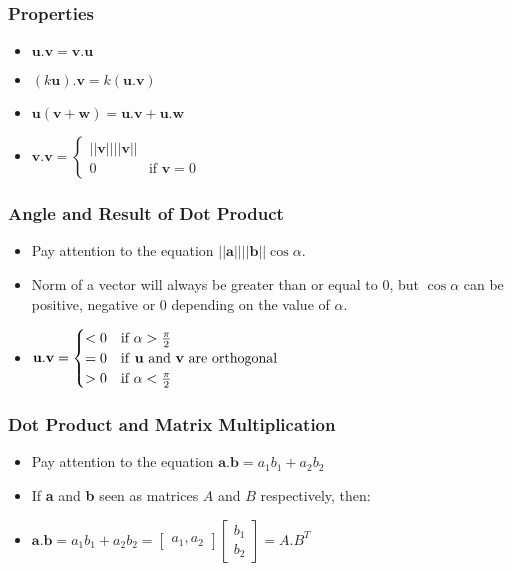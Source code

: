 \documentclass[a4paper,12pt]{article}
\begin{document}
\subsubsection*{Properties}
\begin{itemize}
  \item \(\textbf{u}.\textbf{v}=\textbf{v}.\textbf{u}\)
  \item \((k\textbf{u}).\textbf{v}=k(\textbf{u}.\textbf{v})\)
  \item \(\textbf{u}(\textbf{v}+\textbf{w})=\textbf{u}.\textbf{v}+\textbf{u}.\textbf{w}\)
  \item \(\textbf{v}.\textbf{v}=\begin{cases}
          ||\textbf{v}||||\textbf{v}|| \\
          0 & \text{if $\textbf{v}=0$}
        \end{cases}\)
\end{itemize}

\subsubsection*{Angle and Result of Dot Product}
\begin{itemize}
  \item Pay attention to the equation \(||\textbf{a}||||\textbf{b}||\cos\alpha\).
  \item Norm of a vector will always be greater than or equal to 0, but \(\cos\alpha\) can be positive, negative or 0 depending on the value of \(\alpha\).
  \item[] \(\textbf{u}.\textbf{v}=\begin{cases}
      \text{$<0$} & \text{if $\alpha > \frac{\pi}{2}$}                 \\
      \text{$=0$} & \text{if \textbf{u} and \textbf{v} are orthogonal} \\
      \text{$>0$} & \text{if $\alpha < \frac{\pi}{2}$}                 \\
    \end{cases}\)
\end{itemize}

\subsubsection*{Dot Product and Matrix Multiplication}
\begin{itemize}
  \item Pay attention to the equation \(\textbf{a}.\textbf{b}=a_1b_1+a_2b_2\)
  \item If \textbf{a} and \textbf{b} seen as matrices \(A\) and \(B\) respectively, then:
  \item[] \(\textbf{a}.\textbf{b}=a_1b_1+a_2b_2=\begin{bmatrix}a_1, a_2\end{bmatrix}\begin{bmatrix}b_1 \\ b_2\end{bmatrix}=A.B^T\)
\end{itemize}
\end{document}
